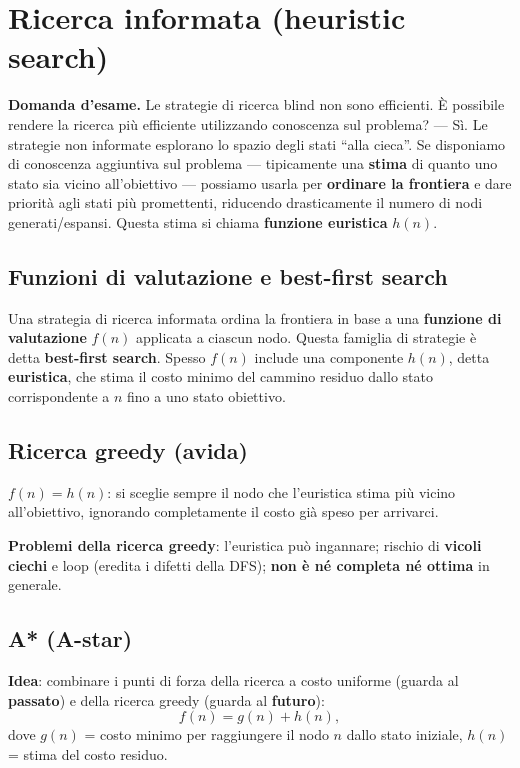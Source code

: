 \documentclass[11pt,a4paper]{report}
\newcommand{\domandaesame}[1]{\begin{esame}\textbf{Domanda d'esame.} #1\end{esame}}
\begin{document}
\section{Ricerca informata (heuristic search)}

\domandaesame{Le strategie di ricerca blind non sono efficienti. È possibile rendere la ricerca più efficiente utilizzando conoscenza sul problema? --- Sì. Le strategie non informate esplorano lo spazio degli stati ``alla cieca''. Se disponiamo di conoscenza aggiuntiva sul problema --- tipicamente una \textbf{stima} di quanto uno stato sia vicino all'obiettivo --- possiamo usarla per \textbf{ordinare la frontiera} e dare priorità agli stati più promettenti, riducendo drasticamente il numero di nodi generati/espansi. Questa stima si chiama \textbf{funzione euristica} $h(n)$.}

\subsection{Funzioni di valutazione e best-first search}

Una strategia di ricerca informata ordina la frontiera in base a una \textbf{funzione di valutazione} $f(n)$ applicata a ciascun nodo. Questa famiglia di strategie è detta \textbf{best-first search}. Spesso $f(n)$ include una componente $h(n)$, detta \textbf{euristica}, che stima il costo minimo del cammino residuo dallo stato corrispondente a $n$ fino a uno stato obiettivo.

\subsection{Ricerca greedy (avida)}

$f(n) = h(n)$: si sceglie sempre il nodo che l'euristica stima più vicino all'obiettivo, ignorando completamente il costo già speso per arrivarci.

\textbf{Problemi della ricerca greedy}: l'euristica può ingannare; rischio di \textbf{vicoli ciechi} e loop (eredita i difetti della DFS); \textbf{non è né completa né ottima} in generale.

\subsection{A* (A-star)}

\textbf{Idea}: combinare i punti di forza della ricerca a costo uniforme (guarda al \textbf{passato}) e della ricerca greedy (guarda al \textbf{futuro}):
\[
f(n) = g(n) + h(n),
\]
dove $g(n)$ = costo minimo per raggiungere il nodo $n$ dallo stato iniziale, $h(n)$ = stima del costo residuo.
\end{document}
